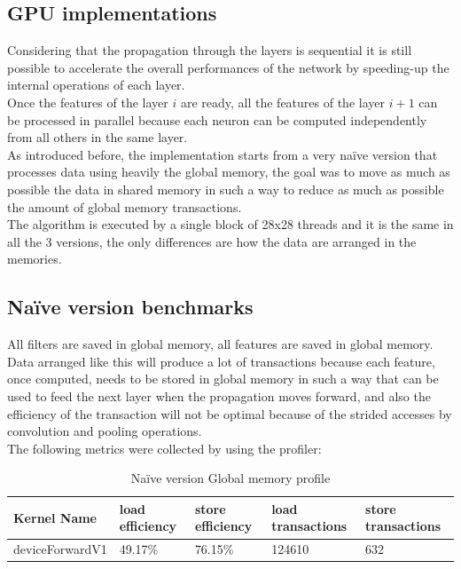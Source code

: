 \documentclass[a4paper]{report}
\begin{document}
\subsection{GPU implementations}
Considering that the propagation through the layers is sequential it is still possible to accelerate the overall performances of the network by speeding-up the internal operations of each layer.\\
Once the features of the layer \( i \) are ready, all the features of the layer \( i+1 \) can be processed in parallel because each neuron can be computed independently from all others in the same layer.\\
As introduced before, the implementation starts from a very naïve version that processes data using heavily the global memory, the goal was to move as much as possible the data in shared memory in such a way to reduce as much as possible the amount of global memory transactions.\\
The algorithm is executed by a single block of 28x28 threads and it is the same in all the 3 versions, the only differences are how the data are arranged in the memories.

\subsection{Naïve version benchmarks}
All filters are saved in global memory, all features are saved in global memory.
Data arranged like this will produce a lot of transactions because each feature, once computed, needs to be stored in global memory in such a way that can be used to feed the next layer when the propagation moves forward, and also the efficiency of the transaction will not be optimal because of the strided accesses by convolution and pooling operations.\\
The following metrics were collected by using the profiler:

\begin{table}[!h]
\centering
\begin{tabular}{|l|l|l|l|l|}
\hline
\textbf{Kernel Name} & \textbf{load efficiency} & \textbf{store efficiency} & \textbf{load transactions} & \textbf{store transactions} \\ \hline
deviceForwardV1           & 49.17\%           & 76.15\%           & 124610           & 632       \\ \hline
\end{tabular}
\vspace*{3mm}
\caption{Naïve version Global memory profile}
\label{table:t1}
\end{table}
\end{document}
